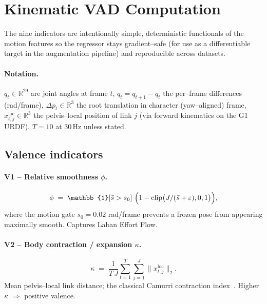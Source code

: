 \medskip

\section{Kinematic VAD Computation}
\label{sec:vad-compute}

The nine indicators are intentionally simple, deterministic functionals of
the motion features so the regressor stays gradient--safe (for use as a
differentiable target in the augmentation pipeline) and reproducible
across datasets.

\paragraph{Notation.}
$q_t\in\mathbb{R}^{29}$ are joint angles at frame $t$,
$\dot q_t = q_{t+1}-q_t$ the per--frame differences (rad/frame),
$\Delta p_t\in\mathbb{R}^3$ the root translation in character (yaw--aligned)
frame, $x^{\text{loc}}_{t,j}\in\mathbb{R}^3$ the pelvis--local position of
link $j$ (via forward kinematics on the G1 URDF). $T=10$ at $30\,$Hz unless
stated.

\subsection{Valence indicators}

\paragraph{V1 -- Relative smoothness $\phi$.}
\begin{equation}
  \phi \;=\; \mathbb{1}\!\left[\bar s > s_0\right]\,\Bigl(1 - \operatorname{clip}\bigl(J/(\bar s+\varepsilon),0,1\bigr)\Bigr),
  \label{eq:phi}
\end{equation}
where the motion gate $s_0\!=\!0.02$ rad/frame prevents a frozen pose from
appearing maximally smooth. Captures Laban Effort\,\textperiodcentered\,Flow.

\paragraph{V2 -- Body contraction / expansion $\kappa$.}
\begin{equation}
  \kappa \;=\; \frac{1}{T\,J}\sum_{t=1}^{T}\sum_{j=1}^{J}\bigl\|x^{\text{loc}}_{t,j}\bigr\|_2.
  \label{eq:kappa}
\end{equation}
Mean pelvis--local link distance; the classical Camurri contraction
index~\cite{camurri2003recognizing}. Higher $\kappa$ $\Rightarrow$
positive valence.

